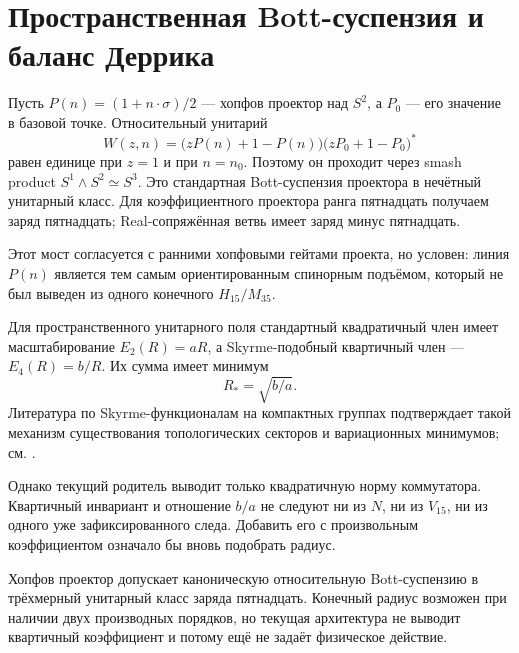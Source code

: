 \chapter{Пространственная Bott-суспензия и баланс Деррика}

Пусть $P(n)=(1+n\cdot\sigma)/2$ --- хопфов проектор над $S^2$, а
$P_0$ --- его значение в базовой точке. Относительный унитарий
\begin{equation}
 W(z,n)=\bigl(zP(n)+1-P(n)\bigr)
 \bigl(zP_0+1-P_0\bigr)^*
 \label{eq:v5-relative-bott-unitary}
\end{equation}
равен единице при $z=1$ и при $n=n_0$. Поэтому он проходит через smash
product $S^1\wedge S^2\simeq S^3$. Это стандартная Bott-суспензия
проектора в нечётный унитарный класс. Для коэффициентного проектора ранга
пятнадцать получаем заряд пятнадцать; Real-сопряжённая ветвь имеет заряд
минус пятнадцать.

Этот мост согласуется с ранними хопфовыми гейтами проекта, но условен:
линия $P(n)$ является тем самым ориентированным спинорным подъёмом,
который не был выведен из одного конечного $H_{15}/M_{35}$.

Для пространственного унитарного поля стандартный квадратичный член имеет
масштабирование $E_2(R)=aR$, а Skyrme-подобный квартичный член ---
$E_4(R)=b/R$. Их сумма имеет минимум
\begin{equation}
 R_*=\sqrt{b/a}.
\end{equation}
Литература по Skyrme-функционалам на компактных группах подтверждает
такой механизм существования топологических секторов и вариационных
минимумов; см. .

Однако текущий родитель выводит только квадратичную норму коммутатора.
Квартичный инвариант и отношение $b/a$ не следуют ни из $N$, ни из
$V_{15}$, ни из одного уже зафиксированного следа. Добавить его с
произвольным коэффициентом означало бы вновь подобрать радиус.

\begin{theorem}
Хопфов проектор допускает каноническую относительную Bott-суспензию в
трёхмерный унитарный класс заряда пятнадцать. Конечный радиус возможен
при наличии двух производных порядков, но текущая архитектура не выводит
квартичный коэффициент и потому ещё не задаёт физическое действие.
\end{theorem}

